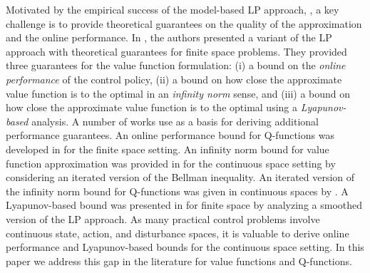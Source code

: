 \documentclass[journal]{IEEEtran}
\newcommand{\textQ}{Q}
\begin{document}
Motivated by the empirical success of the model-based LP approach, \cite{novoa_2009_ADPforVehicleRouting,stellato_2017_ADPforPowerElectronics}, a key challenge is to provide theoretical guarantees on the quality of the approximation and the online performance.
In \cite{vanRoy_linApproxDP}, the authors presented a variant of the LP approach with theoretical guarantees for finite space problems.
They provided three guarantees for the value function formulation: (i) a bound on the \emph{online performance} of the control policy, (ii) a bound on how close the approximate value function is to the optimal in an \emph{infinity norm} sense, and (iii) a bound on how close the approximate value function is to the optimal using a \emph{Lyapunov-based} analysis.
A number of works use \cite{vanRoy_linApproxDP} as a basis for deriving additional performance guarantees.
An online performance bound for \textQ-functions was developed in \cite{vanroy_decentADP} for the finite space setting.
An infinity norm bound for value function approximation was provided in \cite{boyd_iteratedBellman} for the continuous space setting by considering an iterated version of the Bellman inequality.
An iterated version of the infinity norm bound for \textQ-functions was given in continuous spaces  by \cite{beuchat_2016_ECC_PWMQ}.
A Lyapunov-based bound was presented in \cite{vivekFarias_2012_smoothedLPapproach} for finite space by analyzing a smoothed version of the LP approach.
As many practical control problems involve continuous state, action, and disturbance spaces, it is valuable to derive online performance and Lyapunov-based bounds for the continuous space setting.
In this paper we address this gap in the literature for value functions and \textQ-functions.
\end{document}
